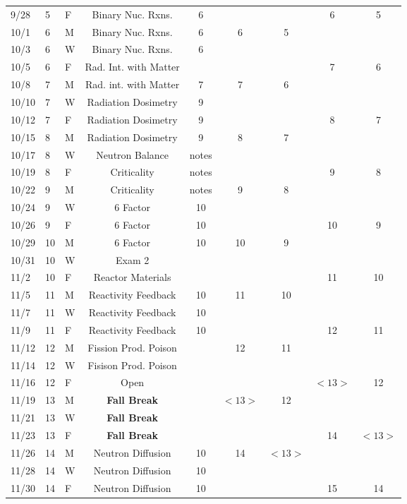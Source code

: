 \documentclass[11pt, a4paper]{article}
\begin{document}
\begin{table}[h]
\begin{center}
\begin{tabular}{lllcccccc}
9/28 & 5 & F & Binary Nuc. Rxns.  & 6 &  &  & 6 & 5 \\
10/1 & 6 & M & Binary Nuc. Rxns.  & 6 & 6 & 5 &  &  \\
10/3 & 6 & W & Binary Nuc. Rxns.  & 6 &  &  &  &  \\
10/5 & 6 & F & Rad. Int. with Matter  &  &  &  & 7 & 6 \\
10/8 & 7 & M & Rad. int. with Matter & 7 & 7 & 6 &  &  \\
10/10 & 7 & W & Radiation Dosimetry  & 9 &  &  &  &  \\
10/12 & 7 & F & Radiation Dosimetry  & 9 &  &  & 8 & 7 \\
10/15 & 8 & M & Radiation Dosimetry  & 9 &  8 & 7 &  &  \\
10/17 & 8 & W & Neutron Balance  & notes &  &  &  &  \\
10/19 & 8 & F & Criticality  & notes &  &  & 9 & 8 \\
10/22 & 9 & M & Criticality  & notes & 9 & 8 &  &  \\
10/24 & 9 & W & 6 Factor  & 10 &  &  &  &  \\
10/26 & 9 & F & 6 Factor  & 10 &  &  & 10 & 9 \\
10/29 & 10 & M & 6 Factor  & 10 & 10 & 9 &  & \\
10/31 & 10 & W & Exam 2  &  &  &  &  &  \\
11/2 & 10 & F & Reactor Materials   &     &    &    &  11  & 10  \\
11/5 & 11 & M & Reactivity Feedback & 10  & 11 & 10 &  &  \\
11/7 & 11 & W & Reactivity Feedback  & 10 &  &  &  &  \\
11/9 & 11 & F & Reactivity Feedback  & 10 &  &  & 12 & 11 \\
11/12 & 12 & M & Fission Prod. Poison &  & 12 & 11 &  &  \\
11/14 & 12 & W & Fisison Prod. Poison  &  &  &  &  &  \\
11/16 & 12 & F & Open &  &  &  &  $<13>$ & 12 \\
11/19 & 13 & M & \textbf{Fall Break}& & $<13>$ & 12 &  &  \\
11/21 & 13 & W & \textbf{Fall Break}  &  &  &  &  &  \\
11/23 & 13 & F & \textbf{Fall Break}  &  &  &  & 14 & $<13>$ \\
11/26 & 14 & M & Neutron Diffusion& 10 &14& $<13>$ &  & \\
11/28 & 14 & W & Neutron Diffusion  & 10 &  &  &  &  \\
11/30 & 14 & F & Neutron Diffusion  & 10  &  &  & 15 & 14 \\

\end{tabular}
\end{center}
\end{table}
\end{document}
